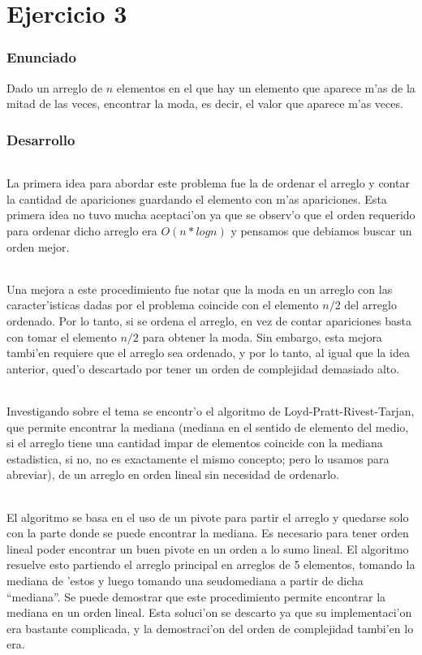 \part{Ejercicio 3}
\section{Enunciado}
Dado un arreglo de $n$ elementos en el que hay un elemento que aparece m'as de la mitad de las 
veces, encontrar la moda, es decir, el valor que aparece m'as veces.

\section{Desarrollo}
\paragraph{}
La primera idea para abordar este problema fue la de ordenar el arreglo y contar la cantidad 
de apariciones guardando el elemento con m'as apariciones. Esta primera idea no tuvo mucha 
aceptaci'on ya que se observ'o que el orden requerido para ordenar dicho arreglo era $O(n*log n)$ y pensamos que debiamos buscar un orden mejor.
\paragraph{}
Una mejora a este procedimiento fue notar que la moda en un arreglo con las caracter'isticas
dadas por el problema coincide con el elemento $n/2$ del arreglo ordenado. Por lo tanto, 
si se ordena el arreglo, en vez de contar apariciones basta con tomar el elemento $n/2$ para 
obtener la moda. Sin embargo, esta mejora tambi'en requiere que el arreglo sea ordenado, y por
lo tanto, al igual que la idea anterior, qued'o descartado por tener un orden de complejidad
demasiado alto.
\paragraph{}
Investigando sobre el tema se encontr'o el algoritmo de Loyd-Pratt-Rivest-Tarjan, que permite 
encontrar la mediana (mediana en el sentido de elemento del medio, si el arreglo tiene una cantidad impar de elementos coincide con la mediana estadistica, si no, no es exactamente el mismo concepto; pero lo usamos para abreviar), de un arreglo en orden lineal sin necesidad de ordenarlo.
\paragraph{}
El algoritmo se basa en el uso de un pivote para partir el arreglo y quedarse solo con la parte donde se 
puede encontrar la mediana. Es necesario para tener orden lineal poder encontrar un buen pivote 
en un orden a lo sumo lineal. El algoritmo resuelve esto partiendo el arreglo principal en arreglos
de 5 elementos, tomando la mediana de 'estos y luego tomando una seudomediana a partir de dicha ``mediana''. 
Se puede demostrar que este procedimiento permite encontrar la mediana en un orden lineal. Esta 
soluci'on se descarto ya que su implementaci'on era bastante complicada, y la demostraci'on del orden de complejidad tambi'en lo era.
